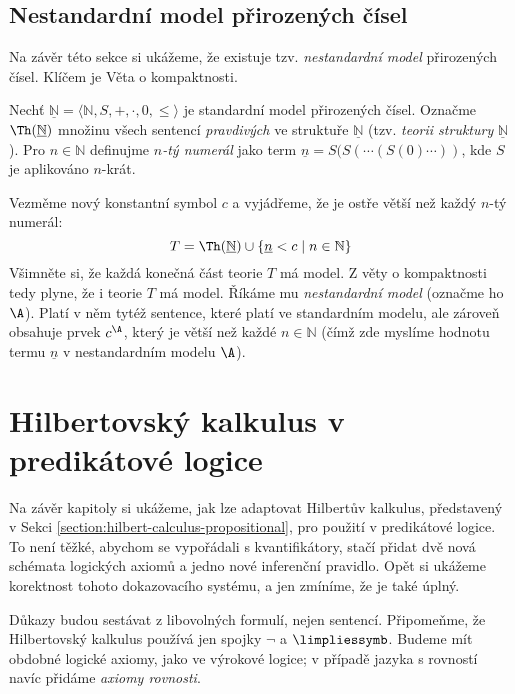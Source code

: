 \subsection{Nestandardní model přirozených čísel}

Na závěr této sekce si ukážeme, že existuje tzv. \emph{nestandardní model} přirozených čísel. Klíčem je Věta o kompaktnosti.
    
Nechť $\underline{\mathbb N}=\langle\mathbb N,S,+,\cdot,0,\leq\rangle$ je standardní model přirozených čísel. Označme $\Th(\underline{\mathbb N})$ množinu všech sentencí \emph{pravdivých} ve struktuře $\underline{\mathbb N}$ (tzv. \emph{teorii struktury} $\underline{\mathbb N}$). Pro $n\in \mathbb N$ definujme \emph{$n$-tý numerál} jako term $\underline n=S(S(\cdots (S(0)\cdots))$, kde $S$ je aplikováno $n$-krát.

Vezměme nový konstantní symbol $c$ a vyjádřeme, že je ostře větší než každý $n$-tý numerál:
$$
T=\Th(\underline{\mathbb N})\cup\{\underline n<c\mid n\in \mathbb N\}
$$
Všimněte si, že každá konečná část teorie $T$ má model. Z věty o kompaktnosti tedy plyne, že i teorie $T$ má model. Říkáme mu \emph{nestandardní model} (označme ho $\A$). Platí v něm tytéž sentence, které platí ve standardním modelu, ale zároveň obsahuje prvek $c^\A$, který je větší než každé $n\in \mathbb N$ (čímž zde myslíme hodnotu termu $\underline n$ v nestandardním modelu $\A$).
    

\section{Hilbertovský kalkulus v predikátové logice}

Na závěr kapitoly si ukážeme, jak lze adaptovat Hilbertův kalkulus, představený v Sekci \ref{section:hilbert-calculus-propositional}, pro použití v predikátové logice. To není těžké, abychom se vypořádali s kvantifikátory, stačí přidat dvě nová schémata logických axiomů a jedno nové inferenční pravidlo. Opět si ukážeme korektnost tohoto dokazovacího systému, a jen zmíníme, že je také úplný.

Důkazy budou sestávat z libovolných formulí, nejen sentencí. Připomeňme, že Hilbertovský kalkulus používá jen spojky $\neg$ a $\limpliessymb$. Budeme mít obdobné logické axiomy, jako ve výrokové logice; v případě jazyka s rovností navíc přidáme \emph{axiomy rovnosti}. 

